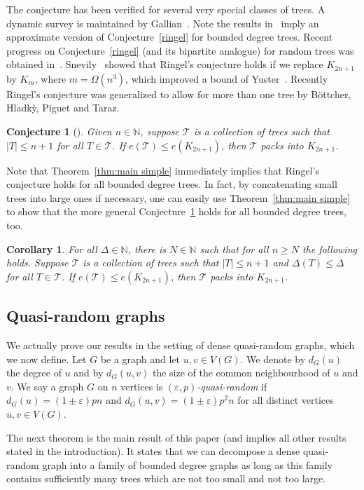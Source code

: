 \documentclass[a4paper, 11pt, reqno]{amsart}
\newtheorem{corollary}[definition]{Corollary}
\newtheorem{conjecture}[definition]{Conjecture}
\numberwithin{equation}{section}
\newcommand{\1}{{\rm 1\hspace*{-0.4ex}%
\rule{0.1ex}{1.52ex}\hspace*{0.2ex}}}
\newcommand{\N}{\mathbb N}
\newcommand{\cT}{\mathcal{T}}
\renewcommand{\epsilon}{\varepsilon}
\begin{document}
The conjecture has been verified for several very special classes of trees. 
A dynamic survey is maintained by Gallian~\cite{Gal98}.
Note the results in~\cite{BHPT16,FLM15,KKOT16,MRS16} imply an approximate version of Conjecture~\ref{ringel} for bounded degree trees.
Recent progress on Conjecture~\ref{ringel} 
(and its bipartite analogue) for random trees was obtained in~\cite{DL14,Lla15}.
Snevily~\cite{Sne97} showed that Ringel's conjecture holds if we replace $K_{2n+1}$ by $K_m$, where $m=\Omega(n^3)$, which improved a bound of Yuster~\cite{Yus00}.
Recently Ringel's conjecture was generalized to allow for more than one tree by B\"ottcher, Hladk\`y, Piguet and Taraz.

\begin{conjecture}[\cite{BHPT16}]\label{BHPTconj43}
Given $n\in\N$, suppose $\cT$ is a collection of trees such that $|T|\leq n+1$ for all $T\in \cT$. 
If $e(\cT) \leq e(K_{2n+1})$, then $\cT$ packs into $K_{2n+1}$.
\end{conjecture}

Note that Theorem~\ref{thm:main simple} immediately implies that Ringel's conjecture holds for all bounded degree trees.
In fact, by concatenating small trees into large ones if necessary, 
one can easily use Theorem~\ref{thm:main simple} to show that the more general Conjecture~\ref{BHPTconj43} holds for all bounded degree trees, too.


\begin{corollary}\label{BHPT 43}
For all $\Delta \in \N$, there is $N\in \N$ such that for all $n\geq N$ the following holds. 
Suppose $\cT$ is a collection of trees such that $|T|\leq n+1$ and $\Delta(T)\leq \Delta$ for all $T\in \cT$. If $e(\cT) \leq e(K_{2n+1})$, then $\cT$ packs into $K_{2n+1}$.
\end{corollary}




\subsection{Quasi-random graphs}
We actually prove our results in the setting of dense quasi-random graphs, which we now define. 
Let $G$ be a graph and let $u,v \in V(G)$.
We denote by $d_G(u)$ the degree of $u$ and by $d_G(u,v)$ the size of the common neighbourhood of $u$ and $v$.
We say a graph $G$ on $n$ vertices is \emph{$(\epsilon,p)$-quasi-random} if $d_G(u)=(1\pm \epsilon)pn$ and $d_G(u,v)=(1\pm \epsilon)p^2n$ for all distinct vertices $u,v\in V(G)$. 

The next theorem is the main result of this paper (and implies all other results stated in the introduction).
It states that
we can decompose a dense quasi-random graph into a family of bounded degree graphs as long as this family contains sufficiently many trees which are not too small and not too large.
\end{document}
